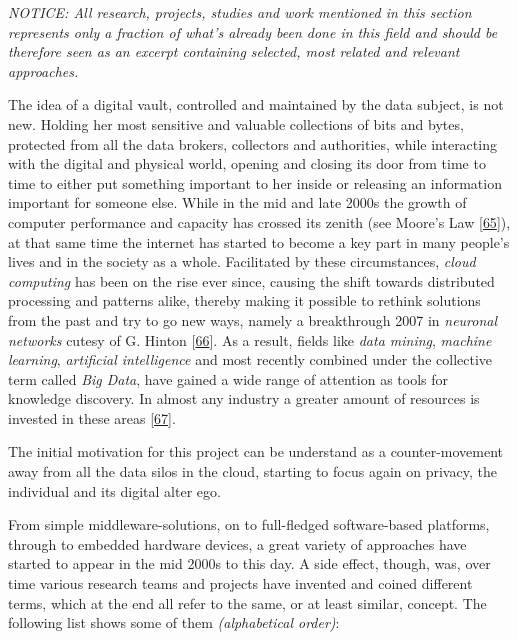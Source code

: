 \documentclass[12pt,english,a4paper,titlepage,cleardoublepage=empty,dottedtoc]{report}
\begin{document}
\emph{NOTICE: All research, projects, studies and work mentioned in this
section represents only a fraction of what's already been done in this
field and should be therefore seen as an excerpt containing selected,
most related and relevant approaches.}

The idea of a digital vault, controlled and maintained by the data
subject, is not new. Holding her most sensitive and valuable collections
of bits and bytes, protected from all the data brokers, collectors and
authorities, while interacting with the digital and physical world,
opening and closing its door from time to time to either put something
important to her inside or releasing an information important for
someone else. While in the mid and late 2000s the growth of computer
performance and capacity has crossed its zenith (see Moore's Law
{[}\protect\hyperlink{ref-paper_1965_moors-law}{65}{]}), at that same
time the internet has started to become a key part in many people's
lives and in the society as a whole. Facilitated by these circumstances,
\emph{cloud computing} has been on the rise ever since, causing the
shift towards distributed processing and patterns alike, thereby making
it possible to rethink solutions from the past and try to go new ways,
namely a breakthrough 2007 in \emph{neuronal networks} cutesy of G.
Hinton
{[}\protect\hyperlink{ref-podcast_2015_cre-neuronale-netze}{66}{]}. As a
result, fields like \emph{data mining}, \emph{machine learning},
\emph{artificial intelligence} and most recently combined under the
collective term called \emph{Big Data}, have gained a wide range of
attention as tools for knowledge discovery. In almost any industry a
greater amount of resources is invested in these areas
{[}\protect\hyperlink{ref-web_2016_industries-intention-to-invest-in-big-data}{67}{]}.

The initial motivation for this project can be understand as a
counter-movement away from all the data silos in the cloud, starting to
focus again on privacy, the individual and its digital alter ego.

From simple middleware-solutions, on to full-fledged software-based
platforms, through to embedded hardware devices, a great variety of
approaches have started to appear in the mid 2000s to this day. A side
effect, though, was, over time various research teams and projects have
invented and coined different terms, which at the end all refer to the
same, or at least similar, concept. The following list shows some of
them \emph{(alphabetical order)}:
\end{document}
